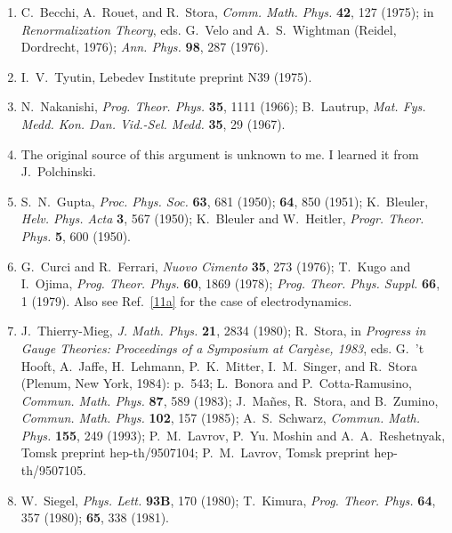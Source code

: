 \begin{enumerate}
  \item {}\label{ch15-ref-10}
  C.~Becchi, A.~Rouet, and R.~Stora, \textit{Comm. Math. Phys.} \textbf{42}, 127 (1975); in \textit{Renormalization Theory}, eds. G.~Velo and A.~S.~Wightman (Reidel, Dordrecht, 1976); \textit{Ann. Phys.} \textbf{98}, 287 (1976).

  \item {}\label{ch15-ref-11}
  I.~V.~Tyutin, Lebedev Institute preprint N39 (1975).

  \item[11a.] \label{ch15-ref-11a}
  N.~Nakanishi, \textit{Prog. Theor. Phys.} \textbf{35}, 1111 (1966); B.~Lautrup, \textit{Mat. Fys. Medd. Kon. Dan. Vid.-Sel. Medd.} \textbf{35}, 29 (1967).

  \item {}\label{ch15-ref-12}
  The original source of this argument is unknown to me. I learned it from J.~Polchinski.

  \item {}\label{ch15-ref-13}
  S.~N.~Gupta, \textit{Proc. Phys. Soc.} \textbf{63}, 681 (1950); \textbf{64}, 850 (1951); K.~Bleuler, \textit{Helv. Phys. Acta} \textbf{3}, 567 (1950); K.~Bleuler and W.~Heitler, \textit{Progr. Theor. Phys.} \textbf{5}, 600 (1950).

  \item[13a.] \label{ch15-ref-13a}
  G.~Curci and R.~Ferrari, \textit{Nuovo Cimento} \textbf{35}, 273 (1976); T.~Kugo and I.~Ojima, \textit{Prog. Theor. Phys.} \textbf{60}, 1869 (1978); \textit{Prog. Theor. Phys. Suppl.} \textbf{66}, 1 (1979). Also see Ref.~\hyperref[ch15-ref-11a]{[11a]} for the case of electrodynamics.

  \item {}\label{ch15-ref-14}
  J.~Thierry-Mieg, \textit{J. Math. Phys.} \textbf{21}, 2834 (1980); R.~Stora, in \textit{Progress in Gauge Theories: Proceedings of a Symposium at Carg\`ese, 1983}, eds. G.~'t Hooft, A.~Jaffe, H.~Lehmann, P.~K.~Mitter, I.~M.~Singer, and R.~Stora (Plenum, New York, 1984): p.~543; L.~Bonora and P.~Cotta-Ramusino, \textit{Commun. Math. Phys.} \textbf{87}, 589 (1983); J.~Ma\~nes, R.~Stora, and B.~Zumino, \textit{Commun. Math. Phys.} \textbf{102}, 157 (1985); A.~S.~Schwarz, \textit{Commun. Math. Phys.} \textbf{155}, 249 (1993); P.~M.~Lavrov, P.~Yu. Moshin and A.~A.~Reshetnyak, Tomsk preprint hep-th/9507104; P.~M.~Lavrov, Tomsk preprint hep-th/9507105.

  \item {}\label{ch15-ref-15}
  W.~Siegel, \textit{Phys. Lett.} \textbf{93B}, 170 (1980); T.~Kimura, \textit{Prog. Theor. Phys.} \textbf{64}, 357 (1980); \textbf{65}, 338 (1981).


\end{enumerate}
